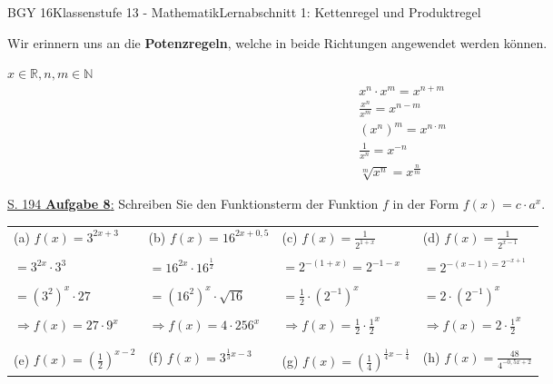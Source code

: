 \documentclass[oneside,openany,headings=optiontotoc,11pt,numbers=noenddot]{scrreprt}
\begin{document}
	\begin{worksheet}{BGY 16}{Klassenstufe 13 - Mathematik}{Lernabschnitt 1: Kettenregel und Produktregel}
				
		\noindent
		\sffamily
		\begin{framed}
			\noindent
			Wir erinnern uns an die \textbf{Potenzregeln}, welche in beide Richtungen angewendet werden können.\\
			\par\noindent
			\(x\in\mathbb{R}, n,m\in\mathbb{N}\)\\
			\begin{align*}
				& x^n\cdot{}x^m = x^{n+m}\\
				& \frac{x^n}{x^m} = x^{n-m}\\
				& \left(x^n\right)^m = x^{n\cdot{}m}\\
				& \frac{1}{x^n} = x^{-n}\\
				& \sqrt[m]{x^n} = x^{\frac{n}{m}}
			\end{align*}
		\end{framed}
		\begin{framed}
			\noindent
			\small{\color{codegray}\underline{S. 194 \textbf{Aufgabe 8}:} Schreiben Sie den Funktionsterm der Funktion \(f\) in der Form \(f(x) = c\cdot{}a^x\).}\\
			\par
			\begin{tabularx}{\textwidth}{l|l|l|l}
				(a) \(f(x)=3^{2x+3}\) & (b) \(f(x) = 16^{2x+0,5}\) & (c) \(f(x) = \frac{1}{2^{1+x}}\) & (d) \(f(x) = \frac{1}{2^{x-1}}\)\\
				& & & \\
				\(= 3^{2x}\cdot{}3^3\) & \(=16^{2x}\cdot{}16^{\frac{1}{2}}\) & \(= 2^{-(1+x)} = 2^{-1-x}\) & \(= 2^{-(x-1) = 2^{-x+1}}\)\\
				& & & \\
				\(= (3^2)^x\cdot{}27\) & \(= (16^2)^x\cdot{}\sqrt{16}\) & \(=\frac{1}{2}\cdot{}(2^{-1})^x\) & \(=2\cdot{}(2^{-1})^x\)\\
				& & & \\
				\(\Rightarrow f(x) = 27\cdot{}9^x\) & \(\Rightarrow f(x) = 4\cdot{}256^x\) & \(\Rightarrow f(x) = \frac{1}{2}\cdot{}\frac{1}{2}^x\) & \(\Rightarrow f(x) = 2\cdot{}\frac{1}{2}^x\)\\
				& & & \\
				\hline
				& & & \\
				(e) \(f(x) = \left(\frac{1}{2}\right)^{x-2}\) & (f) \(f(x) = 3^{\frac{1}{3}x-3}\) & (g) \(f(x)= \left(\frac{1}{4}\right)^{\frac{1}{4}x-\frac{1}{4}}\) & (h) \(f(x) = \frac{48}{4^{-0,5x+2}}\)\\

\end{tabularx}
\end{framed}
\end{worksheet}
\end{document}
